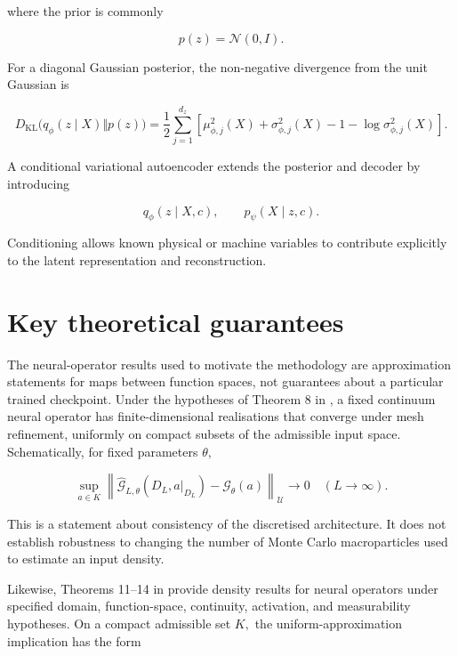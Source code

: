 where the prior is commonly

\begin{equation}
\label{eq:226}
p(z)=\mathcal N(0,I).
\end{equation}

For a diagonal Gaussian posterior, the non-negative divergence from the unit Gaussian is

\begin{equation}
\label{eq:227}
D_{\mathrm{KL}}\bigl(q_{\phi}(z\mid X)\Vert p(z)\bigr)=\frac12\sum_{j=1}^{d_z}\left[\mu_{\phi,j}^2(X)+\sigma_{\phi,j}^2(X)-1-\log\sigma_{\phi,j}^2(X)\right].
\end{equation}

A conditional variational autoencoder extends the posterior and decoder by introducing

\begin{equation}
\label{eq:228}
q_{\phi}(z\mid X,c),\qquad p_{\psi}(X\mid z,c).
\end{equation}

Conditioning allows known physical or machine variables to contribute explicitly to the latent representation and reconstruction.

\section{Key theoretical guarantees}
\label{sec:auxiliary_theoretical_results_key_theoretical_guarantees}

The neural-operator results used to motivate the methodology are approximation statements for maps between function spaces, not guarantees about a particular trained checkpoint. Under the hypotheses of Theorem 8 in \cite{kovachki2023operators}, a fixed continuum neural operator has finite-dimensional realisations that converge under mesh refinement, uniformly on compact subsets of the admissible input space. Schematically, for fixed parameters \(\theta ,\)

\begin{equation}
\label{eq:229}
\sup_{a\in K}\left\|\widehat{\mathcal G}_{L,\theta}(D_L,a|_{D_L})-\mathcal G_{\theta}(a)\right\|_{\mathcal U}\longrightarrow0\quad(L\to\infty).
\end{equation}

This is a statement about consistency of the discretised architecture. It does not establish robustness to changing the number of Monte Carlo macroparticles used to estimate an input density.

Likewise, Theorems 11–14 in \cite{kovachki2023operators} provide density results for neural operators under specified domain, function-space, continuity, activation, and measurability hypotheses. On a compact admissible set \(K ,\) the uniform-approximation implication has the form

